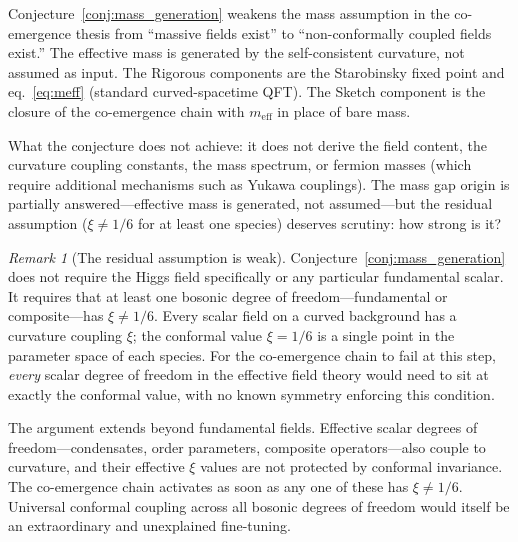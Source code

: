 \documentclass[12pt,a4paper]{article}
\theoremstyle{definition}
\theoremstyle{remark}
\newtheorem{remark}{Remark}
\begin{document}
Conjecture~\ref{conj:mass_generation} weakens the mass assumption in the
co-emergence thesis from ``massive fields exist'' to ``non-conformally
coupled fields exist.'' The effective mass is generated by the
self-consistent curvature, not assumed as input. The Rigorous components
are the Starobinsky fixed point and eq.~\eqref{eq:meff} (standard
curved-spacetime QFT). The Sketch component is the closure of the
co-emergence chain with $m_{\mathrm{eff}}$ in place of bare mass.

What the conjecture does not achieve: it does not derive the field
content, the curvature coupling constants, the mass spectrum, or fermion
masses (which require additional mechanisms such as Yukawa couplings).
The mass gap origin is partially answered---effective mass is generated,
not assumed---but the residual assumption ($\xi \neq 1/6$ for at least
one species) deserves scrutiny: how strong is it?

\begin{remark}[The residual assumption is weak]
\label{rem:residual_weak}
Conjecture~\ref{conj:mass_generation} does not require the Higgs
field specifically or any particular fundamental scalar. It requires
that at least one bosonic degree of freedom---fundamental or
composite---has $\xi \neq 1/6$. Every scalar field on a curved
background has a curvature coupling $\xi$; the conformal value
$\xi = 1/6$ is a single point in the parameter space of each species.
For the co-emergence chain to fail at this step, \emph{every} scalar
degree of freedom in the effective field theory would need to sit at
exactly the conformal value, with no known symmetry enforcing this
condition.

The argument extends beyond fundamental fields. Effective scalar
degrees of freedom---condensates, order parameters, composite
operators---also couple to curvature, and their effective $\xi$ values
are not protected by conformal invariance. The co-emergence chain
activates as soon as any one of these has $\xi \neq 1/6$. Universal
conformal coupling across all bosonic degrees of freedom would itself
be an extraordinary and unexplained fine-tuning.
\end{remark}
\end{document}
